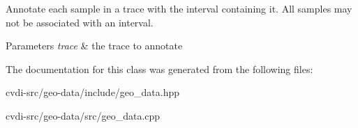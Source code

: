 Annotate each sample in a trace with the interval containing it. All samples may not be associated with an interval. 


\begin{DoxyParams}{Parameters}
{\em trace} & the trace to annotate \\
\hline
\end{DoxyParams}


The documentation for this class was generated from the following files\+:\begin{DoxyCompactItemize}
\item 
cvdi-\/src/geo-\/data/include/geo\+\_\+data.\+hpp\item 
cvdi-\/src/geo-\/data/src/geo\+\_\+data.\+cpp\end{DoxyCompactItemize}

